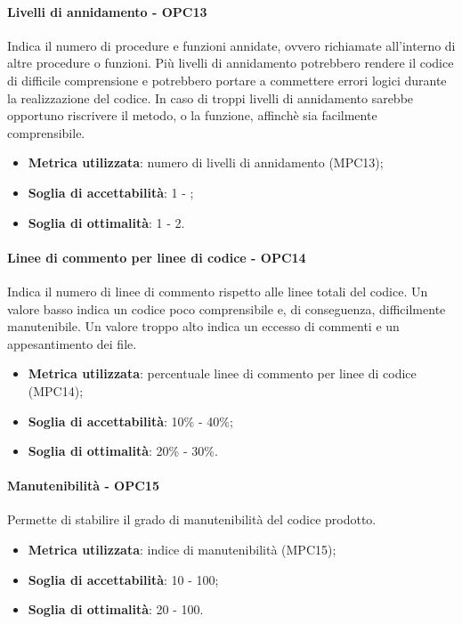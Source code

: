 \documentclass[PdQ.tex]{subfiles}
\begin{document}
			\paragraph{Livelli di annidamento - OPC13}
				Indica il numero di procedure e funzioni annidate, ovvero richiamate all'interno di altre procedure o funzioni. Più livelli di annidamento
				potrebbero rendere il codice di difficile comprensione e potrebbero portare a commettere errori logici durante la realizzazione del codice.
				In caso di troppi livelli di annidamento sarebbe opportuno riscrivere il metodo, o la funzione, affinchè sia facilmente comprensibile.
				\begin{itemize}
					\item \textbf{Metrica utilizzata}: numero di livelli di annidamento (MPC13);
					\item \textbf{Soglia di accettabilità}: 1 - ;
					\item \textbf{Soglia di ottimalità}: 1 - 2.
				\end{itemize}
			
			\paragraph{Linee di commento per linee di codice - OPC14}
				Indica il numero di linee di commento rispetto alle linee totali del codice. Un valore basso indica un codice poco comprensibile
				e, di conseguenza, difficilmente manutenibile. Un valore troppo alto indica un eccesso di commenti e un appesantimento dei file.
				\begin{itemize}
					\item \textbf{Metrica utilizzata}: percentuale linee di commento per linee di codice (MPC14);
					\item \textbf{Soglia di accettabilità}: 10\% - 40\%;
					\item \textbf{Soglia di ottimalità}: 20\% - 30\%.
				\end{itemize}
			
				
			\paragraph{Manutenibilità - OPC15}
				Permette di stabilire il grado di manutenibilità del codice prodotto.
				\begin{itemize}
					\item \textbf{Metrica utilizzata}: indice di manutenibilità (MPC15);
					\item \textbf{Soglia di accettabilità}: 10 - 100;
					\item \textbf{Soglia di ottimalità}: 20 - 100.
				\end{itemize}
		
\end{document}
